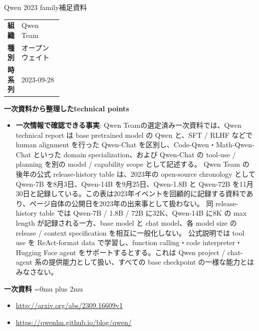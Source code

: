 \begin{technicalnote}{Qwen 2023 family}{補足資料}
\begingroup
\begin{tabularx}{\linewidth}{@{}>{\bfseries}p{0.22\linewidth}X@{}}
組織 & Qwen Team \\
種別 & オープンウェイト \\
時系列 & 2023-09-28 \\
\end{tabularx}
\smallskip
\Needspace{0.35\textheight}
{\bfseries 一次資料から整理したtechnical points}
\begin{itemize}[leftmargin=1.5em,itemsep=0.35em]
\item \textbf{一次情報で確認できる事実}: Qwen Teamの選定済み一次資料では、Qwen technical report は base pretrained model の Qwen と、SFT / RLHF などで human alignment を行った Qwen-Chat を区別し、Code-Qwen・Math-Qwen-Chat といった domain specialization、および Qwen-Chat の tool-use / planning を別の model / capability scope として記述する。 Qwen Team の後年の公式 release-history table は、2023年の open-source chronology として Qwen-7B を8月3日、Qwen-14B を9月25日、Qwen-1.8B と Qwen-72B を11月30日と記録している。この表は2023年イベントを回顧的に記録する資料であり、ページ自体の公開日を2023年の出来事として扱わない。 同 release-history table では Qwen-7B / 1.8B / 72B に32K、Qwen-14B に8K の max length が記録される一方、base model と chat model、各 model size の release / context specification を相互に一般化しない。 公式説明では tool use を ReAct-format data で学習し、function calling・code interpreter・Hugging Face agent をサポートするとする。これは Qwen project / chat-agent 系の提供能力として扱い、すべての base checkpoint の一様な能力とはみなさない。
\end{itemize}
\begin{minipage}{\linewidth}
\begin{samepage}
{\bfseries 一次資料}
\begingroup\sloppy
\Urlmuskip=0mu plus 2mu\relax
\begin{itemize}[leftmargin=1.5em,itemsep=0.25em]
\item {\scriptsize\url{http://arxiv.org/abs/2309.16609v1}}
\item {\scriptsize\url{https://qwenlm.github.io/blog/qwen/}}
\end{itemize}
\endgroup
\end{samepage}
\end{minipage}
\endgroup
\end{technicalnote}
\medskip
